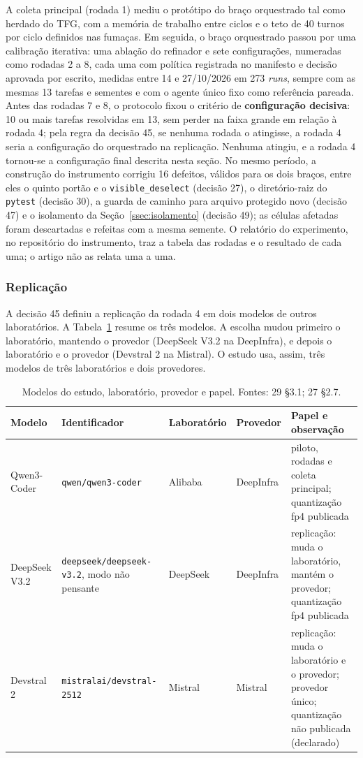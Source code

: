 A coleta principal (rodada 1) mediu o protótipo do braço orquestrado tal como herdado do TFG, com a memória de trabalho entre ciclos e o teto de 40 turnos por ciclo definidos nas fumaças. Em seguida, o braço orquestrado passou por uma calibração iterativa: uma ablação do refinador e sete configurações, numeradas como rodadas 2 a 8, cada uma com política registrada no manifesto e decisão aprovada por escrito, medidas entre 14 e 27/10/2026 em 273 \textit{runs}, sempre com as mesmas 13 tarefas e sementes e com o agente único fixo como referência pareada. Antes das rodadas 7 e 8, o protocolo fixou o critério de \textbf{configuração decisiva}: 10 ou mais tarefas resolvidas em 13, sem perder na faixa grande em relação à rodada 4; pela regra da decisão 45, se nenhuma rodada o atingisse, a rodada 4 seria a configuração do orquestrado na replicação. Nenhuma atingiu, e a rodada 4 tornou-se a configuração final descrita nesta seção. No mesmo período, a construção do instrumento corrigiu 16 defeitos, válidos para os dois braços, entre eles o quinto portão e o \texttt{visible\_deselect} (decisão 27), o diretório-raiz do \texttt{pytest} (decisão 30), a guarda de caminho para arquivo protegido novo (decisão 47) e o isolamento da Seção~\ref{ssec:isolamento} (decisão 49); as células afetadas foram descartadas e refeitas com a mesma semente. O relatório do experimento, no repositório do instrumento, traz a tabela das rodadas e o resultado de cada uma; o artigo não as relata uma a uma.

\subsubsection{Replicação}

A decisão 45 definiu a replicação da rodada 4 em dois modelos de outros laboratórios. A Tabela~\ref{tab-modelos} resume os três modelos. A escolha mudou primeiro o laboratório, mantendo o provedor (DeepSeek V3.2 na DeepInfra), e depois o laboratório e o provedor (Devstral 2 na Mistral). O estudo usa, assim, três modelos de três laboratórios e dois provedores.

\begin{table}[t]
\centering
\caption{Modelos do estudo, laboratório, provedor e papel. Fontes: 29 \S3.1; 27 \S2.7.}
\label{tab-modelos}
\small
\begin{tabular}{p{2.0cm}p{4.3cm}p{1.8cm}p{1.6cm}p{4.4cm}}
\toprule
Modelo & Identificador & Laboratório & Provedor & Papel e observação \\
\midrule
Qwen3-Coder & \texttt{qwen/qwen3-coder} & Alibaba & DeepInfra & piloto, rodadas e coleta principal; quantização fp4 publicada \\
DeepSeek V3.2 & \texttt{deepseek/deepseek-v3.2}, modo não pensante & DeepSeek & DeepInfra & replicação: muda o laboratório, mantém o provedor; quantização fp4 publicada \\
Devstral 2 & \texttt{mistralai/devstral-2512} & Mistral & Mistral & replicação: muda o laboratório e o provedor; provedor único; quantização não publicada (declarado) \\
\bottomrule
\end{tabular}
\end{table}

